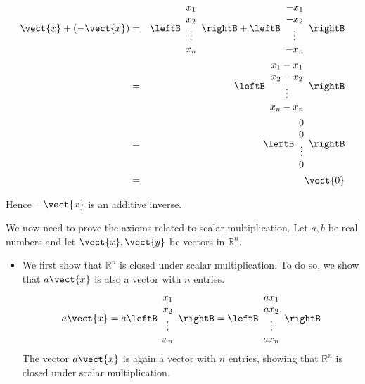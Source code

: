 \begin{solution}
\begin{itemize}
\begin{eqnarray*}
\vect{x} + \left( -\vect{x} \right) &=& 
 \leftB \begin{array}{c}
x_1 \\
x_2 \\
\vdots \\
x_n
\end{array}\rightB + \leftB \begin{array}{c}
-x_1 \\
-x_2 \\
\vdots \\
-x_n
\end{array}\rightB \\
&=& \leftB \begin{array}{c}
x_1-x_1 \\
x_2-x_2 \\
\vdots \\
x_n-x_n
\end{array}\rightB \\
&=& \leftB \begin{array}{c}
0\\
0 \\
\vdots \\
0
\end{array}\rightB \\
&=& \vect{0}
\end{eqnarray*}

Hence $-\vect{x}$ is an additive inverse. 
\end{itemize}

We now need to prove the axioms related to scalar multiplication. Let $a,b$ be real numbers and let $\vect{x}, \vect{y}$ be vectors in $\mathbb{R}^n$. 

\begin{itemize}
\item
We first show that $\mathbb{R}^n$ is closed under scalar multiplication. To do so, we show that $a\vect{x}$ is also a vector with $n$ entries. 
\[
a\vect{x} = a\leftB 
\begin{array}{c}
x_1 \\
x_2 \\
\vdots \\
x_n 
\end{array} \rightB 
=
\leftB 
\begin{array}{c}
ax_1 \\
ax_2 \\
\vdots \\
ax_n 
\end{array} \rightB
\]
The vector $a\vect{x}$ is again a vector with $n$ entries, showing that $\mathbb{R}^n$ is closed under scalar multiplication. 



\end{itemize}
\end{solution}

